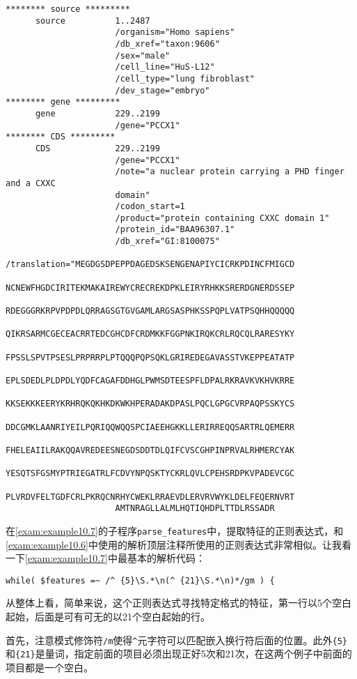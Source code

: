 \begin{lstlisting}[language={},basicstyle=\small\tt,breaklines=false]
******** source *********
      source          1..2487
                      /organism="Homo sapiens"
                      /db_xref="taxon:9606"
                      /sex="male"
                      /cell_line="HuS-L12"
                      /cell_type="lung fibroblast"
                      /dev_stage="embryo"
******** gene *********
      gene            229..2199
                      /gene="PCCX1"
******** CDS *********
      CDS             229..2199
                      /gene="PCCX1"
                      /note="a nuclear protein carrying a PHD finger and a CXXC
                      domain"
                      /codon_start=1
                      /product="protein containing CXXC domain 1"
                      /protein_id="BAA96307.1"
                      /db_xref="GI:8100075"
                      /translation="MEGDGSDPEPPDAGEDSKSENGENAPIYCICRKPDINCFMIGCD
                      NCNEWFHGDCIRITEKMAKAIREWYCRECREKDPKLEIRYRHKKSRERDGNERDSSEP
                      RDEGGGRKRPVPDPDLQRRAGSGTGVGAMLARGSASPHKSSPQPLVATPSQHHQQQQQ
                      QIKRSARMCGECEACRRTEDCGHCDFCRDMKKFGGPNKIRQKCRLRQCQLRARESYKY
                      FPSSLSPVTPSESLPRPRRPLPTQQQPQPSQKLGRIREDEGAVASSTVKEPPEATATP
                      EPLSDEDLPLDPDLYQDFCAGAFDDHGLPWMSDTEESPFLDPALRKRAVKVKHVKRRE
                      KKSEKKKEERYKRHRQKQKHKDKWKHPERADAKDPASLPQCLGPGCVRPAQPSSKYCS
                      DDCGMKLAANRIYEILPQRIQQWQQSPCIAEEHGKKLLERIRREQQSARTRLQEMERR
                      FHELEAIILRAKQQAVREDEESNEGDSDDTDLQIFCVSCGHPINPRVALRHMERCYAK
                      YESQTSFGSMYPTRIEGATRLFCDVYNPQSKTYCKRLQVLCPEHSRDPKVPADEVCGC
                      PLVRDVFELTGDFCRLPKRQCNRHYCWEKLRRAEVDLERVRVWYKLDELFEQERNVRT
                      AMTNRAGLLALMLHQTIQHDPLTTDLRSSADR
\end{lstlisting}

在\autoref{exam:example10.7}的子程序\verb|parse_features|中，提取特征的正则表达式，和\autoref{exam:example10.6}中使用的解析顶层注释所使用的正则表达式非常相似。让我看一下\autoref{exam:example10.7}中最基本的解析代码：

\begin{lstlisting}
while( $features =~ /^ {5}\S.*\n(^ {21}\S.*\n)*/gm ) {
\end{lstlisting}

从整体上看，简单来说，这个正则表达式寻找特定格式的特征，第一行以5个空白起始，后面是可有可无的以21个空白起始的行。

首先，注意模式修饰符\verb|/m|使得\verb|^|元字符可以匹配嵌入换行符后面的位置。此外\verb|{5}|和\verb|{21}|是量词，指定前面的项目必须出现正好5次和21次，在这两个例子中前面的项目都是一个空白。

